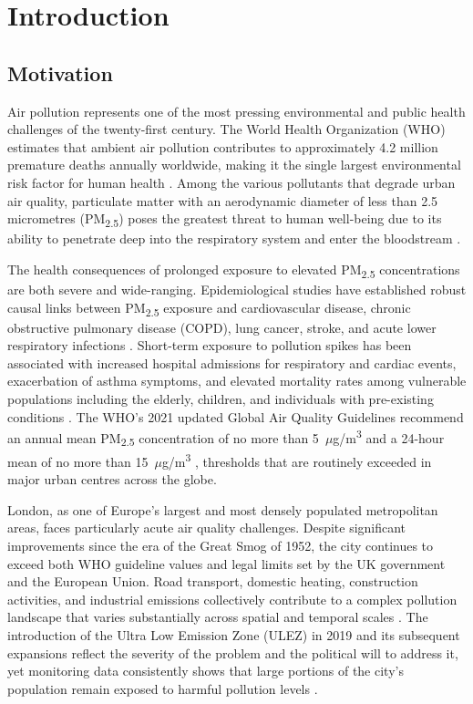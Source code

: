 \chapter{Introduction}
\label{ch:intro}

\section{Motivation}
\label{sec:motivation}

Air pollution represents one of the most pressing environmental and public health challenges of the twenty-first century. The World Health Organization (WHO) estimates that ambient air pollution contributes to approximately 4.2 million premature deaths annually worldwide, making it the single largest environmental risk factor for human health \cite{who2021airquality}. Among the various pollutants that degrade urban air quality, particulate matter with an aerodynamic diameter of less than 2.5 micrometres (PM\textsubscript{2.5}) poses the greatest threat to human well-being due to its ability to penetrate deep into the respiratory system and enter the bloodstream \cite{pope2006health}.

The health consequences of prolonged exposure to elevated PM\textsubscript{2.5} concentrations are both severe and wide-ranging. Epidemiological studies have established robust causal links between PM\textsubscript{2.5} exposure and cardiovascular disease, chronic obstructive pulmonary disease (COPD), lung cancer, stroke, and acute lower respiratory infections \cite{burnett2014integrated}. Short-term exposure to pollution spikes has been associated with increased hospital admissions for respiratory and cardiac events, exacerbation of asthma symptoms, and elevated mortality rates among vulnerable populations including the elderly, children, and individuals with pre-existing conditions \cite{dominici2006fine}. The WHO's 2021 updated Global Air Quality Guidelines recommend an annual mean PM\textsubscript{2.5} concentration of no more than 5~$\mu$g/m\textsuperscript{3} and a 24-hour mean of no more than 15~$\mu$g/m\textsuperscript{3} \cite{who2021airquality}, thresholds that are routinely exceeded in major urban centres across the globe.

London, as one of Europe's largest and most densely populated metropolitan areas, faces particularly acute air quality challenges. Despite significant improvements since the era of the Great Smog of 1952, the city continues to exceed both WHO guideline values and legal limits set by the UK government and the European Union. Road transport, domestic heating, construction activities, and industrial emissions collectively contribute to a complex pollution landscape that varies substantially across spatial and temporal scales \cite{beevers2013trends}. The introduction of the Ultra Low Emission Zone (ULEZ) in 2019 and its subsequent expansions reflect the severity of the problem and the political will to address it, yet monitoring data consistently shows that large portions of the city's population remain exposed to harmful pollution levels \cite{walton2015understanding}.

